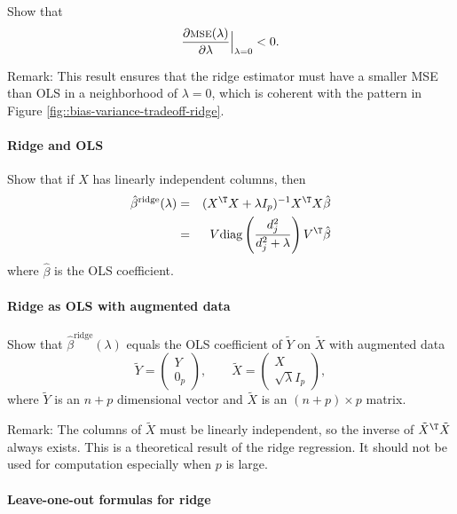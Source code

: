 Show that 
$$
\frac{\partial\textsc{mse}(\lambda)}{\partial\lambda} \Big |_{\lambda = 0} <0 .
$$

Remark: This result ensures that the ridge estimator must have a smaller MSE than OLS in a neighborhood of $\lambda = 0$, which is coherent with the pattern in Figure \ref{fig::bias-variance-tradeoff-ridge}. 



\paragraph{Ridge and OLS}\label{hw13::ridge-ols}


Show that if  $X$ has linearly independent columns, then
\begin{eqnarray*}
\hat{\beta}^{\text{ridge}}(\lambda) 
&=& (X^{\T} X + \lambda I_p)^{-1} X^{\T} X \hat{\beta} \\
&=& V\text{diag}\left(    \frac{  d_j^2 }{  d_j^2 + \lambda   }  \right) V^{\T}  \hat{\beta}
\end{eqnarray*}
where $\hat{\beta}$ is the OLS coefficient.


\paragraph{Ridge as OLS with augmented data}\label{hw13::ridge-data-aug}

Show that $\hat{\beta}^{\text{ridge}}(\lambda)$ equals the OLS coefficient of $\tilde{Y}$ on $\tilde{X}$ with
augmented data
\[
\tilde{Y}=\left(\begin{array}{c}
Y\\
0_{p}
\end{array}\right),\qquad
\tilde{X}=\left(\begin{array}{c}
X\\
\sqrt{\lambda}I_{p}
\end{array}\right) ,
\]
where $ \tilde{Y}$ is an $n+p$ dimensional vector and $ \tilde{X}$ is an $(n+p)\times p$ matrix. 


Remark: The columns of $\tilde{X}$ must be linearly independent, so the inverse of $\tilde{X}^{\T} \tilde{X}$ always exists. 
This is a theoretical result of the ridge regression. It should not be used for computation especially when $p$ is large. 

\paragraph{Leave-one-out formulas for ridge}\label{hw13::loo-ridge}


